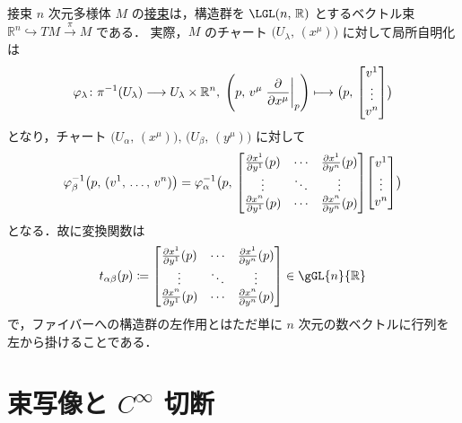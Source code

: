 \documentclass[geometry_main]{subfiles}
\begin{document}
\begin{myexample}[label=ex:tangentbundle]{接束}
    $n$ 次元\cinfty 多様体 $M$ の\hyperref[def:tangentbundle]{接束}は，構造群を $\LGL(n,\, \mathbb{R})$ とするベクトル束
    $\mathbb{R}^n \hookrightarrow TM \xrightarrow{\pi} M$ である．
    実際，$M$ のチャート $\bigl( U_\lambda,\, (x^\mu) \bigr)$ に対して局所自明化は
    \begin{align}
        \varphi_\lambda \colon \pi^{-1} (U_\lambda) \lto U_\lambda \times \mathbb{R}^n,\; \left(p,\, v^\mu \eval{\pdv{}{x^\mu}}_p \right) \lmto \bigl(p,\, \mqty[v^1 \\ \vdots \\ v^n] \bigr)
    \end{align}
    となり，チャート $\bigl( U_\alpha,\, (x^\mu) \bigr),\, \bigl( U_\beta,\, (y^\mu) \bigr)$ に対して
    \begin{align}
        \varphi_\beta^{-1} \bigl( p,\, (v^1,\, \dots,\, v^n) \bigr) = \varphi_\alpha^{-1} \bigl( p,\, \mqty[\pdv{x^1}{y^1}()(p) &\cdots &\pdv{x^1}{y^n}()(p) \\ \vdots &\ddots &\vdots \\ \pdv{x^n}{y^1}()(p) &\cdots &\pdv{x^n}{y^n}()(p)]\mqty[v^1 \\ \vdots \\ v^n] \bigr) 
    \end{align}
    となる．故に変換関数は
    \begin{align}
        t_{\alpha\beta} (p) \coloneqq \mqty[\pdv{x^1}{y^1}()(p) &\cdots &\pdv{x^1}{y^n}()(p) \\ \vdots &\ddots &\vdots \\ \pdv{x^n}{y^1}()(p) &\cdots &\pdv{x^n}{y^n}()(p)] \in \gGL{n}{\mathbb{R}}
    \end{align}
    で，ファイバーへの構造群の左作用とはただ単に $n$ 次元の数ベクトルに行列を左から掛けることである．
\end{myexample}

\section{束写像と $C^\infty$ 切断}

\end{document}
